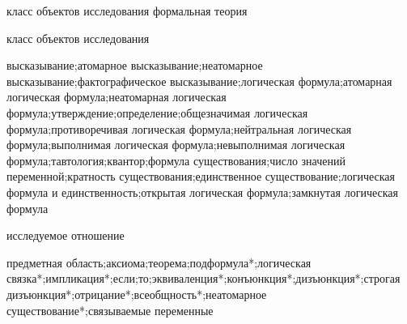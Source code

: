 \begin{SCn}
\scnsectionheader{\currentname}
\begin{scnsubstruct}
\begin{scnhaselementrole}{класс объектов исследования}
формальная теория\end{scnhaselementrole}
\begin{scnhaselementrolelist}{класс объектов исследования}

высказывание;атомарное высказывание;неатомарное высказывание;фактографическое высказывание;логическая формула;атомарная логическая формула;неатомарная логическая формула;утверждение;определение;общезначимая логическая формула;противоречивая логическая формула;нейтральная логическая формула;выполнимая логическая формула;невыполнимая логическая формула;тавтология;квантор;формула существования;число значений переменной;кратность существования;единственное существование;логическая формула и единственность;открытая логическая формула;замкнутая логическая формула

\end{scnhaselementrolelist}
\begin{scnhaselementrolelist}{исследуемое отношение}

предметная область\scnrolesign;аксиома\scnrolesign;теорема\scnrolesign;подформула*;логическая связка*;импликация*;если\scnrolesign;то\scnrolesign;эквиваленция*;конъюнкция*;дизъюнкция*;строгая дизъюнкция*;отрицание*;всеобщность*;неатомарное существование*;связываемые переменные\scnrolesign


\end{scnhaselementrolelist}
\end{scnsubstruct}
\end{SCn}
